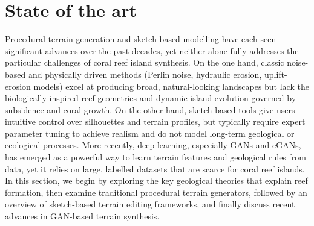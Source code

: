 





\section{State of the art}
\label{sec:coral-island-SotA}

Procedural terrain generation and sketch-based modelling have each seen significant advances over the past decades, yet neither alone fully addresses the particular challenges of coral reef island synthesis. On the one hand, classic noise-based and physically driven methods (Perlin noise, hydraulic erosion, uplift-erosion models) excel at producing broad, natural-looking landscapes but lack the biologically inspired reef geometries and dynamic island evolution governed by subsidence and coral growth. On the other hand, sketch-based tools give users intuitive control over silhouettes and terrain profiles, but typically require expert parameter tuning to achieve realism and do not model long-term geological or ecological processes. More recently, deep learning, especially GANs and cGANs, has emerged as a powerful way to learn terrain features and geological rules from data, yet it relies on large, labelled datasets that are scarce for coral reef islands. In this section, we begin by exploring the key geological theories that explain reef formation, then examine traditional procedural terrain generators, followed by an overview of sketch-based terrain editing frameworks, and finally discuss recent advances in GAN-based terrain synthesis.

